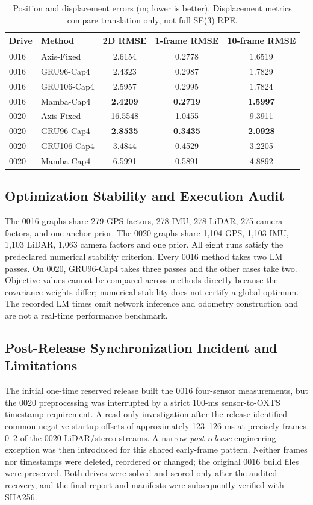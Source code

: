\begin{table}[!t]
\centering
\caption{Position and displacement errors (m; lower is better).
Displacement metrics compare translation only, not full SE(3) RPE.}
\label{tab:v7_secondary}
\begin{tabular}{llccc}
\hline
Drive & Method & 2D RMSE & 1-frame RMSE & 10-frame RMSE\\
\hline
0016 & Axis-Fixed & 2.6154 & 0.2778 & 1.6519\\
0016 & GRU96-Cap4 & 2.4323 & 0.2987 & 1.7829\\
0016 & GRU106-Cap4 & 2.5957 & 0.2995 & 1.7824\\
0016 & Mamba-Cap4 & \textbf{2.4209} & \textbf{0.2719} &
\textbf{1.5997}\\
\hline
0020 & Axis-Fixed & 16.5548 & 1.0455 & 9.3911\\
0020 & GRU96-Cap4 & \textbf{2.8535} & \textbf{0.3435} &
\textbf{2.0928}\\
0020 & GRU106-Cap4 & 3.4844 & 0.4529 & 3.2205\\
0020 & Mamba-Cap4 & 6.5991 & 0.5891 & 4.8892\\
\hline
\end{tabular}
\end{table}

\subsection{Optimization Stability and Execution Audit}
The 0016 graphs share 279 GPS factors, 278 IMU,
278 LiDAR, 275 camera factors, and one anchor prior.
The 0020 graphs share 1,104 GPS, 1,103 IMU,
1,103 LiDAR, 1,063 camera factors and one prior.
All eight runs satisfy the predeclared numerical
stability criterion. Every 0016 method takes two
LM passes. On 0020, GRU96-Cap4 takes three
passes and the other cases take two. Objective
values cannot be compared across methods directly
because the covariance weights differ; numerical
stability does not certify a global optimum.
The recorded LM times omit network inference and
odometry construction and are not a real-time
performance benchmark.

\subsection{Post-Release Synchronization Incident and Limitations}
The initial one-time reserved release built the
0016 four-sensor measurements, but the 0020
preprocessing was interrupted by a strict
100-ms sensor-to-OXTS timestamp requirement.
A read-only investigation after the release
identified common negative startup offsets
of approximately 123--126 ms at precisely
frames 0--2 of the 0020 LiDAR/stereo streams.
A narrow \emph{post-release} engineering exception
was then introduced for this shared early-frame
pattern. Neither frames nor timestamps were
deleted, reordered or changed; the original
0016 build files were preserved. Both drives
were solved and scored only after the audited
recovery, and the final report and manifests
were subsequently verified with SHA256.

